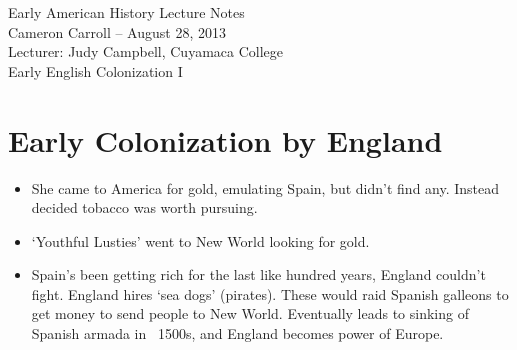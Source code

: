 \documentclass{article}
\begin{document}
  
  \begin{center}
    {\small{} Early American History Lecture Notes} \\[0.6cm]
    {\small{} Cameron Carroll -- August 28, 2013} \\[0.6cm]
    {\small{} Lecturer: Judy Campbell, Cuyamaca College}\\[1cm]
    {\small{} Early English Colonization I}\\[1cm]
  \end{center}
  
  \tableofcontents
  \newpage

  \section{Early Colonization by England}

    \begin{itemize}
      \item She came to America for gold, emulating Spain, but didn't find any. Instead decided tobacco was worth pursuing. 
      \item `Youthful Lusties' went to New World looking for gold. 
      \item Spain's been getting rich for the last like hundred years, England couldn't fight. England hires `sea dogs' (pirates). These would raid Spanish galleons to get money to send people to New World. Eventually leads to sinking of Spanish armada in ~1500s, and England becomes power of Europe.
    \end{itemize}
\end{document}

